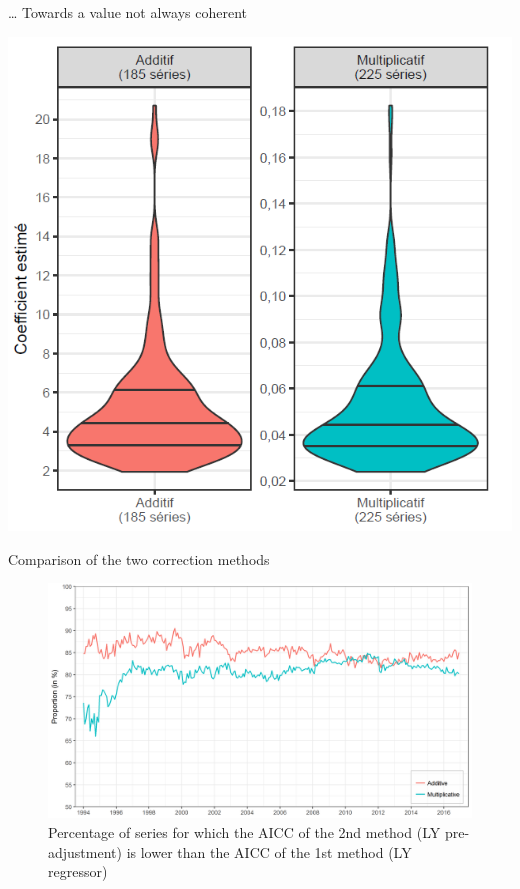 \documentclass[10pt,xcolor=table,color={dvipsnames,usenames},ignorenonframetext,usepdftitle=false,french]{beamer}
\begin{document}
\begin{frame}{\ldots{} Towards a value not always coherent}

\centering
\includegraphics[height = 0.9\textheight]{img/LYvaleur.png}

\end{frame}

\begin{frame}{Comparison of the two correction methods}

\begin{figure}
\centering
\includegraphics[width = \textwidth]{img/LYaicc.png}
\caption{
Percentage of series for which the AICC of the  2nd method (LY pre-adjustment) is lower than the AICC of the 1st method (LY regressor)}
\end{figure}

\end{frame}
\end{document}
